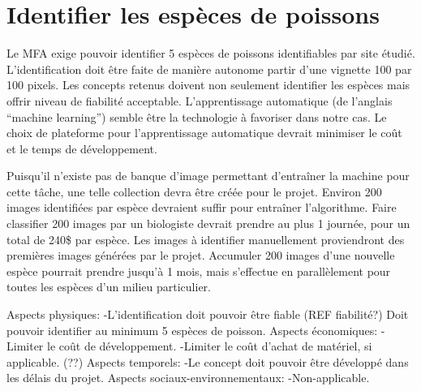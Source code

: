 

\section{Identifier les espèces de poissons}
\label{s:faisab_identifier}
Le MFA exige pouvoir identifier 5 espèces de poissons identifiables par site étudié. L’identification doit être faite de manière autonome partir d’une vignette 100 par 100 pixels. Les concepts retenus doivent non seulement identifier les espèces mais offrir niveau de fiabilité acceptable. L’apprentissage automatique (de l’anglais “machine learning”) semble être la technologie à favoriser dans notre cas. Le choix de plateforme pour l’apprentissage automatique devrait minimiser le coût et le temps de développement.

Puisqu’il n’existe pas de banque d’image permettant d’entraîner la machine pour cette tâche, une telle collection devra être créée pour le projet. Environ 200 images identifiées par espèce devraient suffir pour entraîner l’algorithme.\cite{deeplearn_2015, fishID_2016} Faire classifier 200 images par un biologiste devrait prendre au plus 1 journée, pour un total de 240\$ \cite{sal_biologiste} par espèce. Les images à identifier manuellement proviendront des premières images générées par le projet. Accumuler 200 images d’une nouvelle espèce pourrait prendre jusqu’à 1 mois, mais s’effectue en parallèlement pour toutes les espèces d’un milieu particulier.

Aspects physiques:
-L’identification doit pouvoir être fiable (REF fiabilité?)
Doit pouvoir identifier au minimum 5 espèces de poisson.
Aspects économiques:
-Limiter le coût de développement.
-Limiter le coût d’achat de matériel, si applicable. (??)
Aspects temporels:
-Le concept doit pouvoir être développé dans les délais du projet.
Aspects sociaux-environnementaux:
-Non-applicable.







